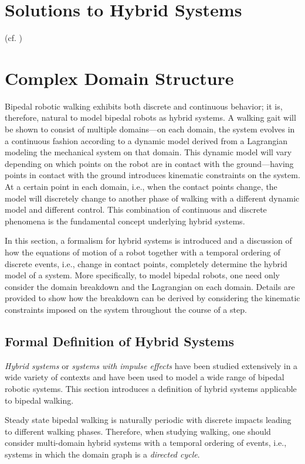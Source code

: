 \section{Solutions to Hybrid Systems}
(cf. \cite{YeMiHo98})

\section{Complex Domain Structure}
Bipedal robotic walking exhibits both discrete and continuous behavior; it is, therefore, natural to model bipedal robots as hybrid systems. A walking gait will be shown to consist of multiple domains---on each domain, the system evolves in a continuous fashion according to a dynamic model derived from a Lagrangian modeling the mechanical system on that domain. This dynamic model will vary depending on which points on the robot are in contact with the ground---having points in contact with the ground introduces kinematic constraints on the system. At a certain point in each domain, i.e., when the contact points change, the model will discretely change to another phase of walking with a different dynamic model and different control. This combination of continuous and discrete phenomena is the fundamental concept underlying hybrid systems.

In this section, a formalism for hybrid systems is introduced and a discussion of how the equations of motion of a robot together with a temporal ordering of discrete events, i.e., change in contact points, completely determine the hybrid model of a system. More specifically, to model bipedal robots, one need only consider the domain breakdown and the Lagrangian on each domain. Details are provided to show how the breakdown can be derived by considering the kinematic constraints imposed on the system throughout the course of a step.


\subsection{Formal Definition of Hybrid Systems}
{\em Hybrid systems} or {\em systems with impulse effects}\cite{GAP01}\xspace have been studied extensively in a wide variety of contexts and have been used to model a wide range of bipedal robotic systems.\cite{GCAS10}\xspace This section introduces a definition of hybrid systems applicable to bipedal walking.

Steady state bipedal walking is naturally periodic with discrete impacts leading to different walking phases. Therefore, when studying walking, one should consider multi-domain hybrid systems with a temporal ordering of events, i.e., systems in which the domain graph is a {\em directed cycle}.

